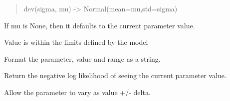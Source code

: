 \documentclass[letterpaper,10pt,english]{sphinxmanual}
\begin{document}
\begin{fulllineitems}
\begin{fulllineitems}
\begin{quote}
dev(sigma, mu) -\textgreater{} Normal(mean=mu,std=sigma)
\end{quote}

If mu is None, then it defaults to the current parameter value.

\end{fulllineitems}


\begin{fulllineitems}
\label{api/mystic.parameter:refl1d.mystic.parameter.Parameter.feasible}
Value is within the limits defined by the model

\end{fulllineitems}


\begin{fulllineitems}
\label{api/mystic.parameter:refl1d.mystic.parameter.Parameter.format}
Format the parameter, value and range as a string.

\end{fulllineitems}


\begin{fulllineitems}
\label{api/mystic.parameter:refl1d.mystic.parameter.Parameter.nllf}
Return the negative log likelihood of seeing the current parameter value.

\end{fulllineitems}


\begin{fulllineitems}
\label{api/mystic.parameter:refl1d.mystic.parameter.Parameter.parameters}
\end{fulllineitems}


\begin{fulllineitems}
\label{api/mystic.parameter:refl1d.mystic.parameter.Parameter.pm}
Allow the parameter to vary as value +/- delta.


\end{fulllineitems}
\end{fulllineitems}
\end{document}
